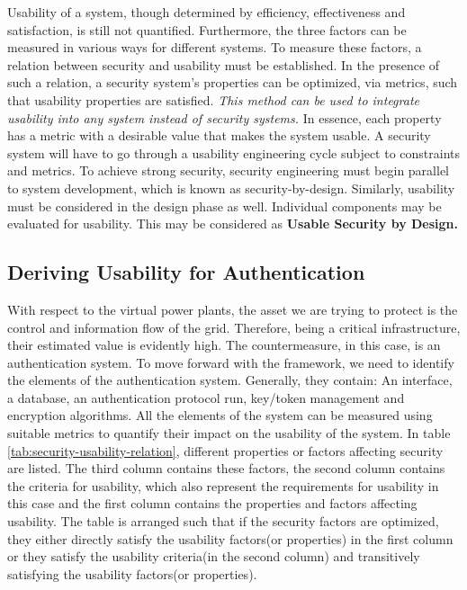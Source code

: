 Usability of a system, though determined by efficiency, effectiveness and satisfaction, is still not quantified. Furthermore, the three factors can be measured in various ways for different systems. To measure these factors, a relation between security and usability must be established. In the presence of such a relation, a security system's properties can be optimized, via metrics, such that usability properties are satisfied. \textit{This method can be used to integrate usability into any system instead of security systems.} In essence, each property has a metric with a desirable value that makes the system usable. A security system will have to go through a usability engineering cycle subject to constraints and metrics. To achieve strong security, security engineering must begin parallel to system development, which is known as security-by-design. Similarly, usability must be considered in the design phase as well. Individual components may be evaluated for usability. This may be considered as \textbf{Usable Security by Design.}


\subsection{Deriving Usability for Authentication}
With respect to the virtual power plants, the asset we are trying to protect is the control and information flow of the grid. Therefore, being a critical infrastructure, their estimated value is evidently high.   
\newline The countermeasure, in this case, is an authentication system. To move forward with the framework, we need to identify the elements of the authentication system. Generally, they contain: An interface, a database, an authentication protocol run, key/token management and encryption algorithms. All the elements of the system can be measured using suitable metrics to quantify their impact on the usability of the system. In table \ref{tab:security-usability-relation}, different properties or factors affecting security are listed. The third column contains these factors, the second column contains the criteria for usability, which also represent the requirements for usability in this case and the first column contains the properties and factors affecting usability. The table is arranged such that if the security factors are optimized, they either directly satisfy the usability factors(or properties) in the first column or they satisfy the usability criteria(in the second column) and transitively satisfying the usability factors(or properties). 


